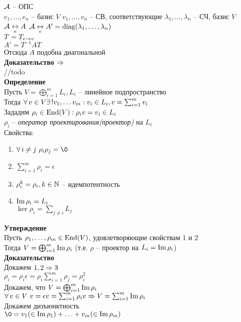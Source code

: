 \documentclass[12pt]{article}
\begin{document}
$\mathcal{A}$ -- ОПС\\
$e_1, \ldots, e_n$ -- базис $V$
$v_1, \ldots, v_n$ -- СВ, соответствующие $\lambda_1, \ldots, \lambda_n$ -- СЧ, базис $V$\\
$\mathcal{A} \underset e{\leftrightarrow} A$
$\mathcal{A} \underset v{\leftrightarrow} A'=\operatorname{diag}(\lambda_1, \ldots, \lambda_n)$\\
$T = T_{e\rightarrow v}$\\
$A' = T^{-1}AT$\\
Отсюда $A$ подобна диагональной\\
\textbf{Доказательство $\Rightarrow$}\\
//todo\\
\textbf{Определение}\\
Пусть $V = \bigoplus_{i=1}^m L_i, L_i$ -- линейное подпространство\\
Тогда $\forall\, v\in V \exists\,! v_1, \ldots v_m: v_i \in L_i, v=\sum_{i=1}^m v_i$\\
Зададим $\rho_i \in \operatorname{End}(V): \rho_i v = v_i \in L_i$\\
$\rho_i$ -- \textit{оператор проектирования(проектор)} на $L_i$\\
Свойства:
\begin{enumerate}
    \item $\fall i \neq j\ \rho_i \rho_j = \0$
    \item $\sum_{i=1}^m \rho_i = \epsilon$
    \item $\rho_i^k = \rho_i, k \in \mathbb{N}$ -- идемпотентность
    \item $\operatorname{Im} \rho_i = L_i$\\
    $\ker \rho_i = \sum_{j \neq i} L_j$
\end{enumerate}
\textbf{Утверждение}\\
Пусть $\rho_1, \ldots, \rho_m \in \operatorname{End}(V)$, удовлетворяющие свойствам 1 и 2\\
Тогда $V = \bigoplus_{i=1}^m \operatorname{Im} \rho_i$ (т.е. $\rho$ -- проектор на $L_i = \operatorname{Im} \rho_i$)\\
\textbf{Доказательство}\\
Докажем $1, 2 \Rightarrow 3$\\
$\rho_i = \rho_i \epsilon = \rho_i \sum_{i=1}^m \rho_j = \rho_i^2$\\
Докажем, что $V = \bigoplus_{i=1}^m \operatorname{Im} \rho_i$\\
$\forall\, v \in V\ v = \epsilon v = \sum_{i=1}^m \rho_i v \Rightarrow V = \sum_{i=1}^m \operatorname{Im} \rho_i$\\
Докажем дизъюнктность\\
$\0 = v_1 (\in \im \rho_1) + \ldots + v_m (\in \im \rho_m)$\\
\end{document}
